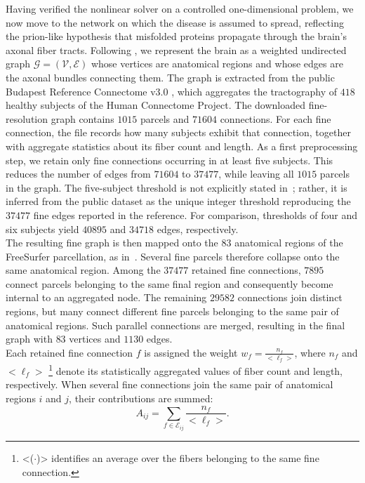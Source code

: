 Having verified the nonlinear solver on a controlled one-dimensional problem, we now move to the network on which the disease is assumed to spread, reflecting the prion-like hypothesis that misfolded proteins propagate through the brain's axonal fiber tracts. Following \cite{fornari2019prion}, we represent the brain as a weighted undirected graph $\mathcal{G}=(\mathcal{V},\mathcal{E})$ whose vertices are anatomical regions and whose edges are the axonal bundles connecting them. The graph is extracted from the public Budapest Reference Connectome v3.0 \cite{szalkai2017budapest}, which aggregates the tractography of $418$ healthy subjects of the Human Connectome Project. The downloaded fine-resolution graph contains $1015$ parcels and $71604$ connections. For each fine connection, the file records how many subjects exhibit that connection, together with aggregate statistics about its fiber count and length. As a first preprocessing step, we retain only fine connections occurring in at least five subjects. This reduces the number of edges from $71604$ to $37477$, while leaving all $1015$ parcels in the graph. The five-subject threshold is not explicitly stated in~\cite{fornari2019prion}; rather, it is inferred from the public dataset as the unique integer threshold reproducing the $37477$ fine edges reported in the reference. For comparison, thresholds of four and six subjects yield $40895$ and $34718$ edges, respectively.\\
The resulting fine graph is then mapped onto the $83$ anatomical regions of the FreeSurfer parcellation, as in~\cite{fornari2019prion}. Several fine parcels therefore collapse onto the same anatomical region. Among the $37477$ retained fine connections, $7895$ connect parcels belonging to the same final region and consequently become internal to an aggregated node. The remaining $29582$ connections join distinct regions, but many connect different fine parcels
belonging to the same pair of anatomical regions. Such parallel connections are merged, resulting in the final graph with $83$ vertices and $1130$ edges.\\
Each retained fine connection $f$ is assigned the weight $w_f =
\frac{n_f}{<\ell_f>}$, where $n_f$ and $<\ell_f>$ \footnote{<($\cdot$)> identifies an average over the fibers belonging to the same fine connection.} denote its statistically aggregated values of fiber count and length, respectively. When several fine connections join the same pair of anatomical regions $i$ and $j$, their contributions are summed:
\[
A_{ij}
=
\sum_{f\in\mathcal{E}_{ij}}
\frac{n_f}{<\ell_f>}.
\]
